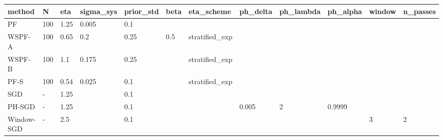 \begin{tabular}{llllllllllll}
\hline
method & N & eta & sigma\_sys & prior\_std & beta & eta\_scheme & ph\_delta & ph\_lambda & ph\_alpha & window & n\_passes \\
\hline
PF & 100 & 1.25 & 0.005 & 0.1 &  &  &  &  &  &  &  \\
WSPF-A & 100 & 0.65 & 0.2 & 0.25 & 0.5 & stratified\_exp &  &  &  &  &  \\
WSPF-B & 100 & 1.1 & 0.175 & 0.25 &  & stratified\_exp &  &  &  &  &  \\
PF-S & 100 & 0.54 & 0.025 & 0.1 &  & stratified\_exp &  &  &  &  &  \\
SGD & - & 1.25 &  & 0.1 &  &  &  &  &  &  &  \\
PH-SGD & - & 1.25 &  & 0.1 &  &  & 0.005 & 2 & 0.9999 &  &  \\
Window-SGD & - & 2.5 &  & 0.1 &  &  &  &  &  & 3 & 2 \\
\hline
\end{tabular}
